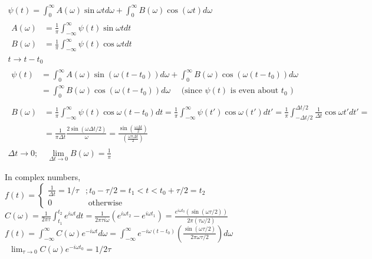 \documentclass[twoside,10pt]{amsart}
\begin{document}
\[
\begin{gathered}
\psi(t) = \int_0^{\infty} A(\omega) \sin{ \omega t} d \omega + \int_0^{\infty} B(\omega) \cos{ (\omega t) } d\omega \\
\begin{aligned}
  A(\omega) & = \frac{1}{\pi} \int_{-\infty}^{\infty} \psi(t) \sin{ \omega t} dt \\
  B(\omega) & = \frac{1}{ \pi} \int_{-\infty}^{\infty} \psi(t) \cos{ \omega t} dt 
\end{aligned}  \\
t \to t- t_0 \\
\begin{aligned}
  \psi(t) & = \int_0^{\infty} A(\omega) \sin{ (\omega (t-t_0) ) } d\omega + \int_0^{\infty} B(\omega) \cos{ (\omega(t-t_0) ) } d\omega \\
  & = \int_0^{\infty} B(\omega) \cos{ (\omega (t-t_0 ) )} d\omega \quad \text{ (since $\psi(t)$ is even about $t_0$ ) } 
\end{aligned} \\
\begin{aligned}
  B(\omega) & = \frac{1}{ \pi} \int_{ -\infty}^{\infty} \psi(t) \cos{ \omega (t-t_0) } dt = \frac{1}{\pi} \int_{-\infty}^{\infty} \psi(t') \cos{ \omega (t') } dt' = \frac{1}{ \pi } \int_{ -\Delta t /2 }^{\Delta t /2 } \frac{1}{ \Delta t} \cos{ \omega t' } dt' = \\
  & = \frac{1}{ \pi \Delta t} \frac{ 2 \sin{ (\omega \Delta t /2 ) } }{ \omega }  = \frac{ \sin{ \left( \frac{ \omega \Delta t}{2 } \right) } }{ \left( \frac{ \omega \pi \Delta t}{ 2 } \right) } 
\end{aligned} \\
\Delta t \to 0 ; \quad \lim_{ \Delta t \to 0 } B(\omega) = \frac{1}{ \pi }
\end{gathered}
\]

In complex numbers, \\
$f(t) = \begin{cases} \frac{1}{\Delta t} = 1/\tau & ; t_0 - \tau/2 = t_1 < t < t_0 +\tau/2 = t_2  \\
  0 & \text{ otherwise } \end{cases}$  \\
$C(\omega) = \frac{1}{ 2\pi \tau} \int_{t_1}^{t_2} e^{i\omega t} dt = \frac{1}{ 2 \pi \tau i \omega }(e^{i \omega t_2 } - e^{i \omega t_1} ) = \frac{ e^{i\omega t_0} (\sin{ (\omega \tau /2) } ) }{ 2 \pi (\tau \omega /2) }$ \\
$f(t) = \int_{-\infty}^{\infty} C(\omega) e^{-i \omega t} d\omega = \int_{-\infty}^{\infty} e^{- i\omega (t - t_0) } \left( \frac{ \sin{ (\omega \tau/2) } }{ 2 \pi \omega \tau /2 } \right) d\omega $ \\
\quad \quad \, $\lim_{\tau \to 0} C(\omega) e^{ - i \omega t_0 } = 1/2 \tau $  
\end{document}
